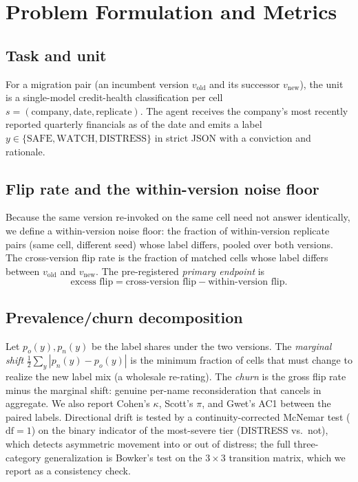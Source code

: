 \documentclass[10pt,twocolumn]{article}
\begin{document}
\section{Problem Formulation and Metrics}
\subsection{Task and unit}
For a migration pair (an incumbent version $v_{\mathrm{old}}$ and its successor $v_{\mathrm{new}}$), the unit is a single-model credit-health classification per cell $s=(\text{company},\text{date},\text{replicate})$. The agent receives the company's most recently reported quarterly financials as of the date and emits a label $y \in \{\text{SAFE},\text{WATCH},\text{DISTRESS}\}$ in strict JSON with a conviction and rationale.

\subsection{Flip rate and the within-version noise floor}
Because the same version re-invoked on the same cell need not answer identically, we define a within-version noise floor: the fraction of within-version replicate pairs (same cell, different seed) whose label differs, pooled over both versions. The cross-version flip rate is the fraction of matched cells whose label differs between $v_{\mathrm{old}}$ and $v_{\mathrm{new}}$. The pre-registered \emph{primary endpoint} is
\begin{equation}
\text{excess flip} = \text{cross-version flip} - \text{within-version flip}.
\end{equation}

\subsection{Prevalence/churn decomposition}
Let $p_o(y),p_n(y)$ be the label shares under the two versions. The \emph{marginal shift} $\tfrac12\sum_y |p_n(y)-p_o(y)|$ is the minimum fraction of cells that must change to realize the new label mix (a wholesale re-rating). The \emph{churn} is the gross flip rate minus the marginal shift: genuine per-name reconsideration that cancels in aggregate. We also report Cohen's $\kappa$, Scott's $\pi$, and Gwet's AC1 between the paired labels. Directional drift is tested by a continuity-corrected McNemar test ($\mathrm{df}=1$) on the binary indicator of the most-severe tier (DISTRESS vs.\ not), which detects asymmetric movement into or out of distress; the full three-category generalization is Bowker's test on the $3\times3$ transition matrix, which we report as a consistency check.
\end{document}
